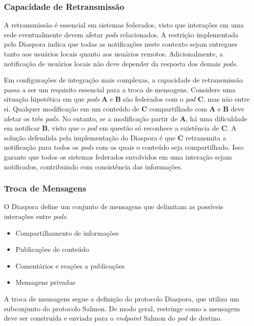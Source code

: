 \subsubsection{Capacidade de Retransmissão}

A retransmissão é essencial em sistemas federados, visto que interações em uma rede
eventualmente devem afetar \textit{pods} relacionados. A restrição implementada pelo
Diaspora indica que todas as notificações neste contexto sejam entregues tanto aos
usuários locais quanto aos usuários remotos. Adicionalmente, a notificação de
usuários locais não deve depender da resposta dos demais \textit{pods}.

Em configurações de integração mais complexas, a capacidade de retransmissão passa a
ser um requisito essencial para a troca de mensagens. Considere uma situação
hipotética em que \textit{pods} \textbf{A} e \textbf{B} são federados com o
\textit{pod} \textbf{C}, mas não entre si. Qualquer modificação em um conteúdo de
\textbf{C} compartilhado com \textbf{A} e \textbf{B} deve afetar os três
\textit{pods}. No entanto, se a modificação partir de \textbf{A}, há uma dificuldade
em notificar \textbf{B}, visto que o \textit{pod} em questão só reconhece a
existência de \textbf{C}. A solução defendida pela implementação do Diaspora é que
\textbf{C} retransmita a notificação para todos os \textit{pods} com os quais o
conteúdo seja compartilhado. Isso garante que todos os sistemas federados envolvidos
em uma interação sejam notificados, contribuindo com consistência das informações.

\subsubsection{Troca de Mensagens}

O Diaspora define um conjunto de mensagens que delimitam as possíveis interações
entre \textit{pods}.

\begin{itemize}
  \item{Compartilhamento de informações}
  \item{Publicações de conteúdo}
  \item{Comentários e reações a publicações}
  \item{Mensagens privadas}
\end{itemize}

A troca de mensagens segue a definição do protocolo Diaspora, que utiliza um
subconjunto do protocolo Salmon. De modo geral, restringe como a mensagem deve ser
construída e enviada para o \textit{endpoint} Salmon do \textit{pod} de destino. 

